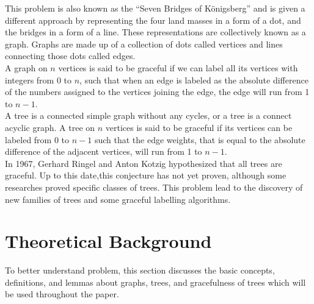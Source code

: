 \documentclass[a4paper, 11pt]{article}
\begin{document}
\indent This problem is also known as the “Seven Bridges of K\"{o}nigsberg” and is given a different approach by representing the four land masses in a form of a dot, and the bridges in a form of a line. These representations are collectively known as a graph. Graphs are made up of a collection of dots called vertices and lines connecting those dots called edges.\\

\indent A graph on $n$ vertices is said to be graceful if we can label all its vertices with integers from 0 to $n$, such that when an edge is labeled as the absolute difference of the numbers assigned to the vertices joining the edge, the edge will run from 1 to $n-1$.\\

\indent A tree is a connected simple graph without any cycles, or a tree is a connect acyclic graph. A tree on $n$ vertices is said to be graceful if its vertices can be labeled from 0 to $n-1$ such that the edge weights, that is equal to the absolute difference of the adjacent vertices, will run from 1 to $n-1$.\\

\indent In 1967, Gerhard Ringel and Anton Kotzig hypothesized that all trees are graceful. Up to this date,this conjecture has not yet proven, although some researches proved specific classes of trees. This problem lead to the discovery of new families of trees and some graceful labelling algorithms.
\section{Theoretical Background}
\indent
\indent To better understand problem, this section discusses the basic concepts, definitions, and lemmas about graphs, trees, and gracefulness of trees which will be used throughout the paper.
\end{document}
